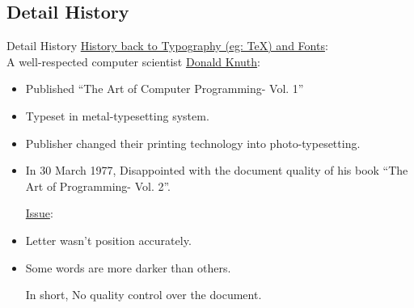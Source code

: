 \documentclass[11pt]{beamer}
\begin{document}
\subsection{Detail History}
\begin{frame}{Detail History}
\underline{\color{brown}History back to Typography (eg: \TeX) and Fonts}:\\
A well-respected computer scientist {\color{blue}\href{https://en.wikipedia.org/wiki/Donald_Knuth}{Donald Knuth}}:\\

\begin{itemize}

\item Published \textquotedblleft The Art of Computer Programming- Vol. 1\textquotedblright
\item Typeset in metal-typesetting system.

\item Publisher changed their printing technology into photo-typesetting.

\item In 30 March 1977, {\color{red}Disappointed} with the document quality of his book \textquotedblleft The Art of Programming- Vol. 2\textquotedblright. 


\pause

\vspace{0.2cm}
\underline{\color{brown}Issue}:

\item Letter wasn't position accurately.
\item Some words are more darker than others.

\pause

{\color{red} In short, No quality control over the document.}
 
\end{itemize}
\end{frame}

\end{document}
